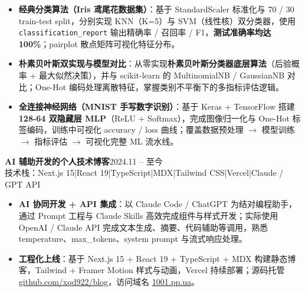 \documentclass[10pt,a4paper]{article}
\newcommand{\projectblock}[3]{%
    {\bfseries\color{darktext}#1}\hfill{\color{graytext}#2}\\%
    {\small\color{graytext}#3}%
    \vspace{0.2em}%
}
\begin{document}
\begin{itemize}[leftmargin=1.5em, itemsep=2pt, parsep=0pt, topsep=2pt]
    \item \textbf{经典分类算法（Iris 鸢尾花数据集）}：基于 StandardScaler 标准化与 70 / 30 train-test split，分别实现 KNN（K=5）与 SVM（线性核）双分类器，使用 \texttt{classification\_report} 输出精确率 / 召回率 / F1，\textbf{测试准确率均达 100\%}；pairplot 散点矩阵可视化特征分布。
    \item \textbf{朴素贝叶斯双实现与模型对比}：从零实现\textbf{朴素贝叶斯分类器底层算法}（后验概率 + 最大似然决策），并与 scikit-learn 的 MultinomialNB / GaussianNB 对比；One-Hot 编码处理离散特征，掌握类别不平衡下的多指标评估逻辑。
    \item \textbf{全连接神经网络（MNIST 手写数字识别）}：基于 Keras + TensorFlow 搭建\textbf{ 128-64 双隐藏层 MLP}（ReLU + Softmax），完成图像归一化与 One-Hot 标签编码，训练中可视化 accuracy / loss 曲线；覆盖数据预处理 $\to$ 模型训练 $\to$ 指标评估 $\to$ 可视化完整 ML 流水线。
\end{itemize}

\vspace{0.15em}

\projectblock{AI 辅助开发的个人技术博客}{2024.11 -- 至今}{技术栈：Next.js 15\hspace{0.3em}|\hspace{0.3em}React 19\hspace{0.3em}|\hspace{0.3em}TypeScript\hspace{0.3em}|\hspace{0.3em}MDX\hspace{0.3em}|\hspace{0.3em}Tailwind CSS\hspace{0.3em}|\hspace{0.3em}Vercel\hspace{0.3em}|\hspace{0.3em}Claude / GPT API}

\begin{itemize}[leftmargin=1.5em, itemsep=2pt, parsep=0pt, topsep=2pt]
    \item \textbf{AI 协同开发 + API 集成}：以 Claude Code / ChatGPT 为结对编程助手，通过 Prompt 工程与 Claude Skills 高效完成组件与样式开发；实际使用 OpenAI / Claude API 完成文本生成、摘要、代码辅助等调用，熟悉 temperature、max\_tokens、system prompt 与流式响应处理。
    \item \textbf{工程化上线}：基于 Next.js 15 + React 19 + TypeScript + MDX 构建静态博客，Tailwind + Framer Motion 样式与动画，Vercel 持续部署；源码托管 \href{https://github.com/xqd922/blog}{github.com/xqd922/blog}，访问域名 \href{https://1001.pp.ua}{1001.pp.ua}。
\end{itemize}
\end{document}

